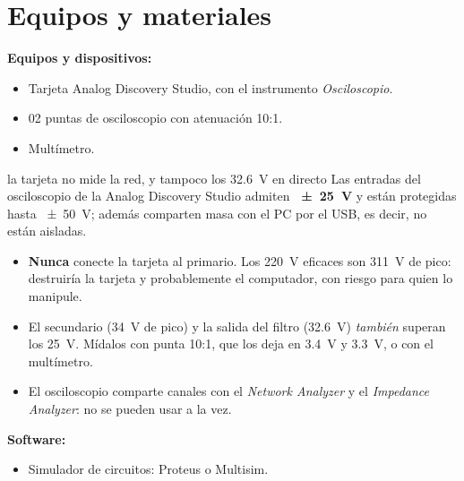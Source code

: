 \documentclass[11pt,a4paper]{article}
\begin{document}
\FloatBarrier
\section{Equipos y materiales}
\noindent\textbf{Equipos y dispositivos:}
\begin{itemize}
    \item Tarjeta Analog Discovery Studio, con el instrumento \emph{Osciloscopio}.
    \item 02 puntas de osciloscopio con atenuación 10:1.
    \item Multímetro.
\end{itemize}

\begin{notatec}{la tarjeta no mide la red, y tampoco los \qty{32.6}{\volt} en directo}
Las entradas del osciloscopio de la Analog Discovery Studio admiten
\textbf{\qty{\pm25}{\volt}} y están protegidas hasta \qty{\pm50}{\volt}; además comparten
masa con el PC por el USB, es decir, no están aisladas.
\begin{itemize}
    \item \textbf{Nunca} conecte la tarjeta al primario. Los \qty{220}{\volt} eficaces son
          \qty{311}{\volt} de pico: destruiría la tarjeta y probablemente el computador,
          con riesgo para quien lo manipule.
    \item El secundario (\qty{34}{\volt} de pico) y la salida del filtro
          (\qty{32.6}{\volt}) \emph{también} superan los \qty{25}{\volt}. Mídalos con
          punta 10:1, que los deja en \qty{3.4}{\volt} y \qty{3.3}{\volt}, o
          con el multímetro.
    \item El osciloscopio comparte canales con el \emph{Network Analyzer} y el
          \emph{Impedance Analyzer}: no se pueden usar a la vez.
\end{itemize}
\end{notatec}

\noindent\textbf{Software:}
\begin{itemize}
    \item Simulador de circuitos: Proteus o Multisim.
\end{itemize}
\end{document}

